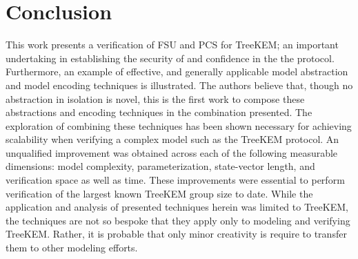 \documentclass[authordraft,sigconf]{acmart}
\newcommand{\Abrev}[1]{\gls{#1}}
\begin{document}
 
\section{Conclusion}

This work presents a verification of \Abrev{FSU} and \Abrev{PCS} for TreeKEM; an important undertaking in establishing the security of and confidence in the the protocol.
Furthermore, an example of effective, and generally applicable model abstraction and model encoding techniques is illustrated.
The authors believe that, though no abstraction in isolation is novel, this is the first work to compose these abstractions and encoding techniques in the combination presented.
The exploration of combining these techniques has been shown necessary for achieving scalability when verifying a complex model such as the TreeKEM protocol.
An unqualified improvement was obtained across each of the following measurable dimensions: model complexity,  parameterization, state-vector length, and verification space as well as time.
These improvements were essential to perform verification of the largest known TreeKEM group size to date.
While the application and analysis of presented techniques herein was limited to TreeKEM, the techniques are not so bespoke that they apply only to modeling and verifying TreeKEM.
Rather, it is probable that only minor creativity is require to transfer them to other modeling efforts.









\pagebreak
\end{document}
